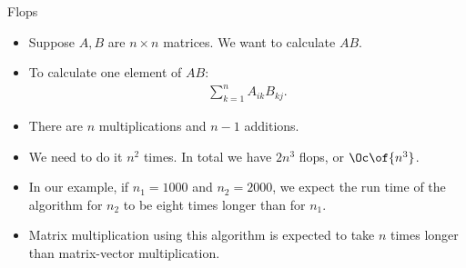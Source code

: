\documentclass[11pt,xcolor={dvipsnames},aspectratio=159,hyperref={pdftex,pdfpagemode=UseNone,hidelinks,pdfdisplaydoctitle=true},usepdftitle=false]{beamer}
\begin{document}
    \begin{frame}{Flops}
        \begin{itemize}
            \item  Suppose $A,B$ are $n\times n$ matrices. We want to calculate $AB$.
            \item  To calculate one element of $AB$: \begin{align*}
                \sum_{k=1}^n A_{ik} B_{kj}.
            \end{align*}
            \item There are $n$ multiplications and $n-1$ additions.
            \item We need to do it $n^2$ times. In total we have $2n^3$ flops, or $\Oc\of{n^3}$.    
            \item In our example, if $n_1 = 1000$ and $n_2 = 2000$, we expect the run time of the algorithm for $n_2$ to be eight times longer than for $n_1$.
            \item Matrix multiplication using this algorithm is expected to take $n$ times longer than matrix-vector multiplication.
        \end{itemize}    
        \end{frame}
    
\end{document}
